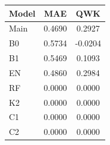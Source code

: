 \begin{table}
\centering
\begin{tabular}{lcc}
\hline
Model & MAE & QWK \\
\hline
Main & 0.4690 & 0.2927 \\
B0 & 0.5734 & -0.0204 \\
B1 & 0.5469 & 0.1093 \\
EN & 0.4860 & 0.2984 \\
RF & 0.0000 & 0.0000 \\
K2 & 0.0000 & 0.0000 \\
C1 & 0.0000 & 0.0000 \\
C2 & 0.0000 & 0.0000 \\
\hline
\end{tabular}
\end{table}